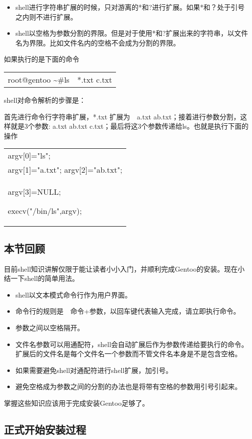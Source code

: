 \documentclass[amstex,twoside]{ctexbook}
\newenvironment{code}{\small\tt\begin{longtable}{p{0.8\textwidth}}}{\end{longtable}}
\begin{document}
\begin{itemize}
\item shell进行字符串扩展的时候，只对游离的*和?进行扩展。如果*和？处于引号之内则不进行扩展。
\item shell以空格为参数分割的界限。但是对于使用*和?扩展出来的字符串，以文件名为界限。比如文件名内的空格不会成为分割的界限。
\end{itemize}


如果执行的是下面的命令
\begin{code}
root@gentoo \textasciitilde \#ls　*.txt c.txt
\end{code}

shell对命令解析的步骤是：

首先进行命令行字符串扩展，*.txt 扩展为　a.txt ab.txt；接着进行参数分割，这样就是3个参数: a.txt ab.txt c.txt；最后将这3个参数传递给ls。也就是执行下面的操作

\begin{code}
argv[0]="ls";\\
argv[1]="a.txt";
argv[2]="ab.txt";\\
argv[3]=NULL;

execv("/bin/ls",argv);
\end{code}

\subsection*{本节回顾}

目前shell知识讲解仅限于能让读者小小入门，并顺利完成Gentoo的安装。现在小结一下shell的简单用法。

\begin{itemize}
\item shell以文本模式命令行作为用户界面。
\item 命令行的规则是　命令+参数，以回车键代表输入完成，请立即执行命令。
\item 参数之间以空格隔开。
\item 文件名参数可以用通配符，shell会自动扩展后作为参数传递给要执行的命令。扩展后的文件名是每个文件名一个参数而不管文件名本身是不是包含空格。
\item 如果需要避免shell对通配符进行shell扩展，加引号。
\item 避免空格成为参数之间的分割的办法也是将带有空格的参数用引号引起来。
\end{itemize}

掌握这些知识应该用于完成安装Gentoo足够了。

\subsection{正式开始安装过程}
\end{document}
